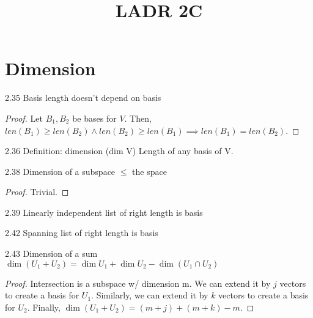 \documentclass[12pt, letterpaper]{article}
\title{LADR 2C}
\begin{document}
\maketitle

\section*{Dimension}

\begin{imp}
{2.35 Basis length doesn't depend on basis}  
\begin{proof}
Let $B_1,B_2$ be bases for $V$. 
Then, $len(B_1)\geq len(B_2) \land len(B_2)\geq len(B_1)\implies len(B_1)=len(B_2)$.
\end{proof}
\end{imp}

\begin{imp}
{2.36 Definition: dimension (dim V)}
Length of any basis of V.
\end{imp}

\begin{imp}
{2.38 Dimension of a subspace $\leq$ the space}
\begin{proof}
Trivial.
\end{proof}
\end{imp}

\begin{imp}
{2.39 Linearly independent list of right length is basis}
\end{imp}

\begin{imp}
{2.42 Spanning list of right length is basis}
\end{imp}

\begin{imp}
{2.43 Dimension of a sum}
$\dim(U_1+U_2)=\dim U_1+\dim U_2-\dim(U_1\cap U_2)$
\begin{proof}
Intersection is a subspace w/ dimension m. We can extend it by $j$ vectors 
to create a basis for $U_1$. Similarly, we can extend it by $k$ vectors
to create a basis for $U_2$. Finally, $\dim(U_1+U_2)=(m+j)+(m+k)-m$.
\end{proof}
\end{imp}
\end{document}
